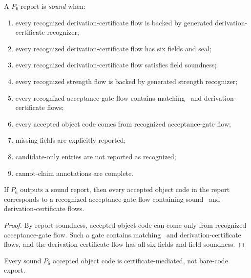 \begin{definition}
\label{def:deriv-accept-sound-p6-report}
A $P_6$ report is \emph{sound} when:
\begin{enumerate}
\item every recognized derivation-certificate flow is backed by generated derivation-certificate recognizer;
\item every recognized derivation-certificate flow has six fields and seal;
\item every recognized derivation-certificate flow satisfies field soundness;
\item every recognized strength flow is backed by generated strength recognizer;
\item every recognized acceptance-gate flow contains matching \NameCert\ and derivation-certificate flows;
\item every accepted object code comes from recognized acceptance-gate flow;
\item missing fields are explicitly reported;
\item candidate-only entries are not reported as recognized;
\item cannot-claim annotations are complete.
\end{enumerate}
\end{definition}

\begin{theorem}
\label{thm:deriv-accept-sound-p6-report}
If $P_6$ outputs a sound report, then every accepted object code in the report corresponds to a recognized acceptance-gate flow containing sound \NameCert\ and derivation-certificate flows.
\end{theorem}

\begin{proof}
By report soundness, accepted object code can come only from recognized acceptance-gate flow. Such a gate contains matching \NameCert\ and derivation-certificate flows, and the derivation-certificate flow has all six fields and field soundness.
\end{proof}

\begin{corollary}
\label{cor:deriv-accept-code-certificate-mediated}
Every sound $P_6$ accepted object code is certificate-mediated, not bare-code export.
\end{corollary}

